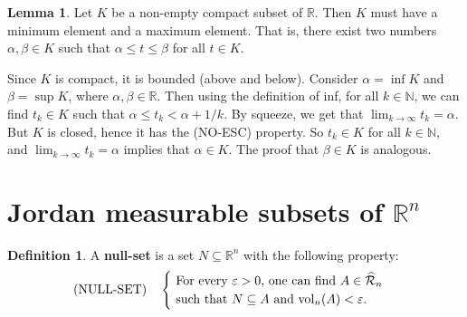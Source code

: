 \documentclass[11pt]{article}
\makeatletter
\theoremstyle{definition}
\newtheorem{defn}[thm]{Definition}
\newtheorem{lemma}[thm]{Lemma}
\newcommand{\N}{\ensuremath{\mathbb{N}}}
\newcommand{\R}{\ensuremath{\mathbb{R}}}
\newenvironment{pf}[1][\proofname]{\par
  \pushQED{\qed}%
  \normalfont \topsep0\p@\relax
  \trivlist
  \item[\hskip\labelsep\itshape
  #1\@addpunct{.}]\ignorespaces
}{%
  \popQED\endtrivlist\@endpefalse
}
\makeatother
\begin{document}
\begin{lemma}
Let $K$ be a non-empty compact subset of $\R$. Then $K$ must have a minimum element and a maximum element. That is, there exist two numbers $\alpha, \beta \in K$ such that $\alpha \leq t \leq \beta$ for all $t \in K$. 
\end{lemma}
\begin{pf}
Since $K$ is compact, it is bounded (above and below). Consider $\alpha = \inf K$ and $\beta = \sup K$, where $\alpha, \beta \in \R$. Then using the definition of inf, for all $k \in \N$, we can find $t_k \in K$ such that $\alpha \leq t_k < \alpha + 1/k$. By squeeze, we get that $\lim_{k\to\infty} t_k = \alpha$. But $K$ is closed, hence it has the (NO-ESC) property. So $t_k \in K$ for all $k \in \N$, and $\lim_{k\to\infty} t_k = \alpha$ implies that $\alpha \in K$. The proof that $\beta \in K$ is analogous.
\end{pf}

\newpage
{}
\section{Jordan measurable subsets of $\R^n$}

\begin{defn}
A {\bf null-set} is a set $N \subseteq \R^n$ with the following property:
$$(\text{NULL-SET}) \quad \begin{cases} \text{ For every $\varepsilon > 0$, one can find $A \in \widehat{\mathcal{R}}_n$} \\ \text{ such that $N \subseteq A$ and ${\rm vol}_n(A) < \varepsilon.$} \end{cases}$$
\end{defn}
\end{document}
